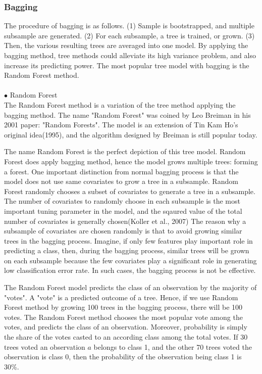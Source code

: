 \documentclass[11pt,a4paper,oneside]{article}
\begin{document}
\subsubsection{Bagging}
The procedure of bagging is as follows. (1) Sample is bootstrapped, and multiple subsample are generated. (2) For each subsample, a tree is trained, or grown. (3) Then, the various resulting trees are averaged into one model. By applying the bagging method, tree methods could alleviate its high variance problem, and also increase its predicting power. The most popular tree model with bagging is the Random Forest method.
\\
\\
$\bullet$ Random Forest\\
The Random Forest method is a variation of the tree method applying the bagging method. The name "Random Forest" was coined by Leo Breiman in his 2001 paper: "Random Forests".\cite{breiman2001random} The model is an extension of Tin Kam Ho's original idea(1995)\cite{ho1995random}, and the algorithm designed by Breiman is still popular today.
\par
The name Random Forest is the perfect depiction of this tree model. Random Forest does apply bagging method, hence the model grows multiple trees: forming a forest. One important distinction from normal bagging process is that the model does not use same covariates to grow a tree in a subsample. Random Forest randomly chooses a subset of covariates to generate a tree in a subsample. The number of covariates to randomly choose in each subsample is the most important tuning parameter in the model, and the sqaured value of the total number of covariates is generally chosen(Koller et al., 2007)\cite{koller2007introduction} The reason why a subsample of covariates are chosen randomly is that to avoid growing similar trees in the bagging process. Imagine, if only few features play important role in predicting a class, then, during the bagging process, similar trees will be grown on each subsample because the few covariates play a significant role in generating low classification error rate. In such cases, the bagging process is not be effective. 
\par
The Random Forest model predicts the class of an observation by the majority of "votes". A "vote" is a predicted outcome of a tree. Hence, if we use Random Forest method by growing 100 trees in the bagging process, there will be 100 votes. The Random Forest method chooses the most popular vote among the votes, and predicts the class of an observation. Moreover, probability is simply the share of the votes casted to an according class among the total votes. If 30 trees voted an observation $a$ belongs to class 1, and the other 70 trees voted the observation is class 0, then the probability of the observation being class 1 is 30\%.
\end{document}
